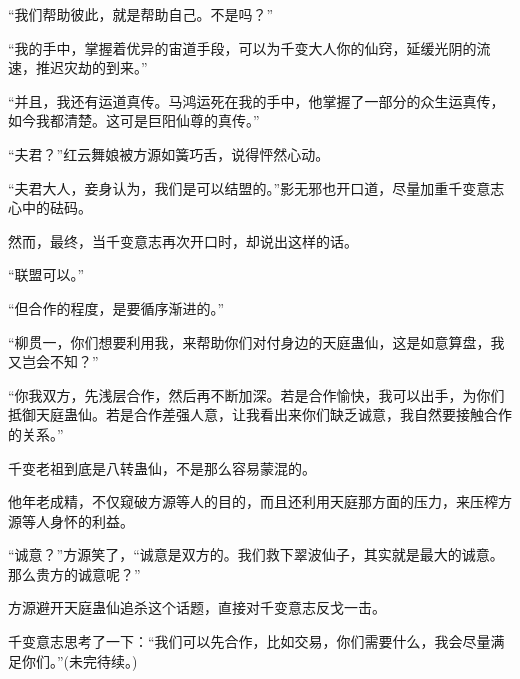 \begin{this_body}
“我们帮助彼此，就是帮助自己。不是吗？”

“我的手中，掌握着优异的宙道手段，可以为千变大人你的仙窍，延缓光阴的流速，推迟灾劫的到来。”

“并且，我还有运道真传。马鸿运死在我的手中，他掌握了一部分的众生运真传，如今我都清楚。这可是巨阳仙尊的真传。”

“夫君？”红云舞娘被方源如簧巧舌，说得怦然心动。

“夫君大人，妾身认为，我们是可以结盟的。”影无邪也开口道，尽量加重千变意志心中的砝码。

然而，最终，当千变意志再次开口时，却说出这样的话。

“联盟可以。”

“但合作的程度，是要循序渐进的。”

“柳贯一，你们想要利用我，来帮助你们对付身边的天庭蛊仙，这是如意算盘，我又岂会不知？”

“你我双方，先浅层合作，然后再不断加深。若是合作愉快，我可以出手，为你们抵御天庭蛊仙。若是合作差强人意，让我看出来你们缺乏诚意，我自然要接触合作的关系。”

千变老祖到底是八转蛊仙，不是那么容易蒙混的。

他年老成精，不仅窥破方源等人的目的，而且还利用天庭那方面的压力，来压榨方源等人身怀的利益。

“诚意？”方源笑了，“诚意是双方的。我们救下翠波仙子，其实就是最大的诚意。那么贵方的诚意呢？”

方源避开天庭蛊仙追杀这个话题，直接对千变意志反戈一击。

千变意志思考了一下：“我们可以先合作，比如交易，你们需要什么，我会尽量满足你们。”(未完待续。)

\end{this_body}

